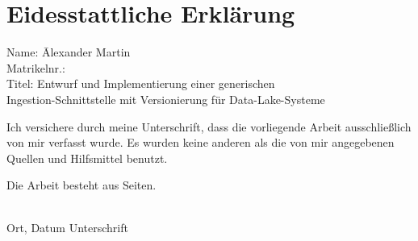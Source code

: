 \section*{Eidesstattliche Erklärung}

\begin{tabbing}
  Name: \hspace{4em}\= Alexander Martin\\
  Matrikelnr.: \\
  Titel: \> Entwurf und Implementierung einer generischen \\ 
         \> Ingestion-Schnittstelle mit Versionierung für Data-Lake-Systeme
\end{tabbing}

Ich versichere durch meine Unterschrift, dass die vorliegende
Arbeit ausschließlich von mir verfasst wurde.
Es wurden keine anderen als die von mir angegebenen Quellen und Hilfsmittel
benutzt.

Die Arbeit besteht aus \underline{\hspace{3em}} Seiten.

\vspace{8ex}
\begin{tabbing}
  \underline{\hspace{14em}} \hspace{3em}\= \underline{\hspace{14em}} \\
  Ort, Datum \> Unterschrift
\end{tabbing}